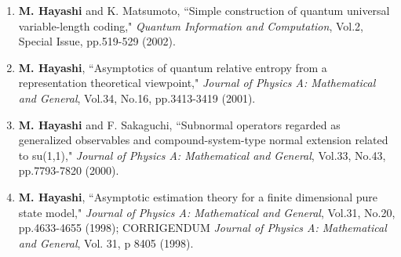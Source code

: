 \documentclass[a4paper,12pt,oneside]{article}
\begin{document}
\begin{enumerate}
\item
\textbf{M. Hayashi} and K. Matsumoto, ``Simple construction of quantum universal variable-length coding," 
{\em Quantum Information and Computation}, Vol.2, Special Issue, pp.519-529 (2002).

\item
\textbf{M. Hayashi}, ``Asymptotics of quantum relative entropy from a representation theoretical viewpoint," 
{\em Journal of Physics A: Mathematical and General}, Vol.34, No.16, pp.3413-3419 (2001).

\item
\textbf{M. Hayashi} and F. Sakaguchi, ``Subnormal operators regarded as generalized observables and compound-system-type normal extension related to su(1,1)," 
{\em Journal of Physics A: Mathematical and General}, Vol.33, No.43, pp.7793-7820 (2000).

\item
\textbf{M. Hayashi}, ``Asymptotic estimation theory for a finite dimensional pure state model," 
{\em Journal of Physics A: Mathematical and General}, Vol.31, No.20, pp.4633-4655 (1998); 
CORRIGENDUM {\em Journal of Physics A: Mathematical and General}, Vol. 31, p 8405 (1998).
\end{enumerate}
\end{document}
